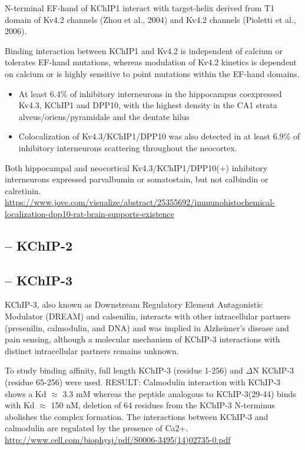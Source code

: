 N-terminal EF-hand of KChIP1 interact with target-helix derived from T1 domain
of Kv4.2 channels (Zhou et al., 2004) and Kv4.2 channels (Pioletti et al.,
2006).

Binding interaction between KChIP1 and Kv4.2 is independent of calcium or
tolerates EF-hand mutations, whereas modulation of Kv4.2 kinetics is dependent
on calcium or is highly sensitive to point mutations within the EF-hand domains.

\begin{itemize}
  \item  At least 6.4\% of inhibitory interneurons in the hippocampus
  coexpressed Kv4.3, KChIP1 and DPP10, with the highest density in the CA1
  strata alveus/oriens/pyramidale and the dentate hilus 
  
  \item Colocalization of Kv4.3/KChIP1/DPP10 was also detected in at least 6.9\%
   of inhibitory interneurons scattering throughout the neocortex. 
\end{itemize}
Both hippocampal and neocortical Kv4.3/KChIP1/DPP10(+) inhibitory interneurons
expressed parvalbumin or somatostain, but not calbindin or calretinin. 
\url{https://www.jove.com/visualize/abstract/25355692/immunohistochemical-localization-dpp10-rat-brain-supports-existence}


\subsection{-- KChIP-2}
\label{sec:KChIP-2}

\subsection{-- KChIP-3}
\label{sec:KChIP-3}

KChIP-3, also known as Downstream Regulatory Element Antagonistic Modulator
(DREAM) and calsenilin, interacts with other intracellular partners (presenilin,
calmodulin, and DNA) and was implied in Alzheimer's disease and pain sensing,
although a molecular mechanism of KChIP-3 interactions with distinct
intracellular partners remains unknown.

To study binding affinity, full length KChIP-3 (residue 1-256) and $\Delta$N
KChIP-3 (residue 65-256) were used. RESULT: Calmodulin interaction with KChIP-3
shows a Kd $\approx$ 3.3 mM whereas the peptide analogous to KChIP-3(29-44)
binds with Kd $\approx$ 150 nM, deletion of 64 residues from the KChIP-3
N-terminus abolishes the complex formation. 
The interactions between KChIP-3 and calmodulin are regulated by the presence of
Ca2+. \url{http://www.cell.com/biophysj/pdf/S0006-3495(14)02735-0.pdf}

